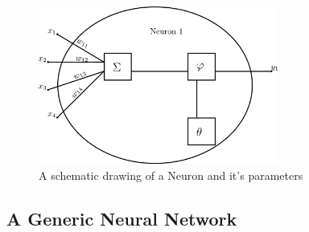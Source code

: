 \begin{figure}[h!]
\label{fig:neuron}
\caption{A schematic drawing of a Neuron and it's parameters}
\centering
\includegraphics[width=0.7\textwidth]{images/neuron.png}
\end{figure}

\subsection{A Generic Neural Network}
\label{sec:fund:netSetup}

